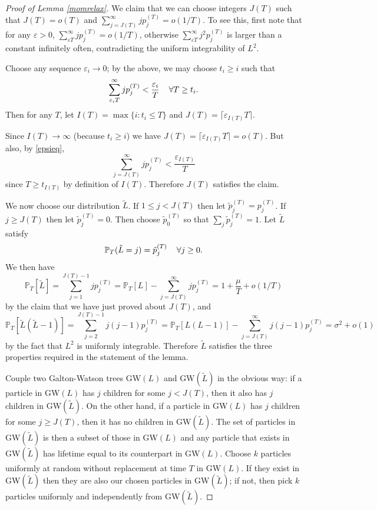 \documentclass{article}
\theoremstyle{plain}
\theoremstyle{definition}
\renewcommand{\P}{\mathbb{P}}
\newcommand{\eps}{\varepsilon}
\begin{document}
\begin{proof}[Proof of Lemma \ref{momrelax}]
We claim that we can choose integers $J(T)$ such that $J(T)=o(T)$ and $\sum_{j=J(T)}^\infty j p_j^{(T)} = o(1/T)$. To see this, first note that for any $\eps>0$, $\sum_{\eps T}^\infty jp_j^{(T)} = o(1/T)$, otherwise $\sum_{\eps T}^\infty j^2 p_j^{(T)}$ is larger than a constant infinitely often, contradicting the uniform integrability of $L^2$.

Choose any sequence $\eps_i\to 0$; by the above, we may choose $t_i\ge i$ such that
\begin{equation}\label{epsieq}
\sum_{\eps_i T}^\infty j p_j^{(T)} < \frac{\eps_i}{T} \hspace{4mm} \forall T\ge t_i.
\end{equation}
Then for any $T$, let $I(T) = \max\{i : t_i\le T\}$ and $J(T) = \lceil\eps_{I(T)}T\rceil$.

Since $I(T)\to\infty$ (because $t_i\ge i$) we have $J(T) = \lceil\eps_{I(T)}T\rceil =o(T)$. But also, by \eqref{epsieq},
\[\sum_{j=J(T)}^\infty j p_j^{(T)} < \frac{\eps_{I(T)}}{T}\]
since $T\ge t_{I(T)}$ by definition of $I(T)$. Therefore $J(T)$ satisfies the claim.

We now choose our distribution $\tilde L$. If $1\le j < J(T)$ then let $\tilde p^{(T)}_j = p^{(T)}_j$. If $j\ge J(T)$ then let $\tilde p^{(T)}_j = 0$. Then choose $\tilde p^{(T)}_0$ so that $\sum_j \tilde p^{(T)}_j = 1$. Let $\tilde L$ satisfy 
\[\P_T(\tilde L = j) = \tilde p^{(T)}_j \hspace{4mm} \forall j\ge 0.\]
We then have
\[\P_T[\tilde L] = \sum_{j=1}^{J(T)-1} j p^{(T)}_j = \P_T[L] - \sum_{j= J(T)}^\infty jp^{(T)}_j = 1+\frac{\mu}{T} + o(1/T)\]
by the claim that we have just proved about $J(T)$, and
\[\P_T[\tilde L(\tilde L-1)] = \sum_{j=2}^{J(T)-1} j(j-1) p^{(T)}_j = \P_T[L(L-1)] - \sum_{j=J(T)}^\infty j(j-1)p^{(T)}_j = \sigma^2 + o(1)\]
by the fact that $L^2$ is uniformly integrable. Therefore $\tilde L$ satisfies the three properties required in the statement of the lemma.

Couple two Galton-Watson trees GW$(L)$ and GW$(\tilde L)$ in the obvious way: if a particle in GW$(L)$ has $j$ children for some $j<J(T)$, then it also has $j$ children in GW$(\tilde L)$. On the other hand, if a particle in GW$(L)$ has $j$ children for some $j\ge J(T)$, then it has no children in GW$(\tilde L)$. The set of particles in GW$(\tilde L)$ is then a subset of those in GW$(L)$ and any particle that exists in GW$(\tilde L)$ has lifetime equal to its counterpart in GW$(L)$. Choose $k$ particles uniformly at random without replacement at time $T$ in GW$(L)$. If they exist in GW$(\tilde L)$ then they are also our chosen particles in GW$(\tilde L)$; if not, then pick $k$ particles uniformly and independently from GW$(\tilde L)$.


\end{proof}
\end{document}

